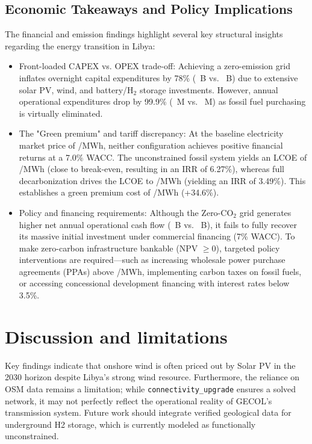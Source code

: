 \documentclass[preprint,12pt]{elsarticle}
\begin{document}
\subsection{Economic Takeaways and Policy Implications}
The financial and emission findings highlight several key structural insights regarding the energy transition in Libya:

\begin{itemize}
    \item {Front-loaded CAPEX vs. OPEX trade-off:} Achieving a zero-emission grid inflates overnight capital expenditures by 78\% (~B vs. ~B) due to extensive solar PV, wind, and battery/$\text{H}_2$ storage investments. However, annual operational expenditures drop by 99.9\% (~M vs. ~M) as fossil fuel purchasing is virtually eliminated.
    \item {The "Green premium" and tariff discrepancy:} At the baseline electricity market price of /MWh, neither configuration achieves positive financial returns at a 7.0\% WACC. The unconstrained fossil system yields an LCOE of /MWh (close to break-even, resulting in an IRR of 6.27\%), whereas full decarbonization drives the LCOE to /MWh (yielding an IRR of 3.49\%). This establishes a green premium cost of /MWh (+34.6\%).
    \item {Policy and financing requirements:} Although the Zero-$\text{CO}_2$ grid generates higher net annual operational cash flow (~B vs. ~B), it fails to fully recover its massive initial investment under commercial financing (7\% WACC). To make zero-carbon infrastructure bankable (NPV $\ge 0$), targeted policy interventions are required—such as increasing wholesale power purchase agreements (PPAs) above /MWh, implementing carbon taxes on fossil fuels, or accessing concessional development financing with interest rates below 3.5\%.
\end{itemize}


\section{Discussion and limitations}
Key findings indicate that onshore wind is often priced out by Solar PV in the 2030 horizon despite Libya's strong wind resource. Furthermore, the reliance on OSM data remains a limitation; while \texttt{connectivity\_upgrade} ensures a solved network, it may not perfectly reflect the operational reality of GECOL's transmission system. Future work should integrate verified geological data for underground H2 storage, which is currently modeled as functionally unconstrained.
\end{document}
